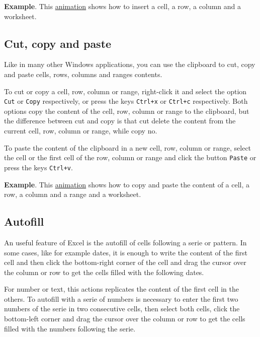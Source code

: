 \textbf{Example}.  This \href{http://aprendeconalf.es/office/excel/manual/img/example_data_insert.gif}{animation} shows how to insert a cell, a row, a column and a worksheet.

\subsection{Cut, copy and paste}\hypertarget{cut-copy-and-paste}{}\label{cut-copy-and-paste}

Like in many other Windows applications, you can use the clipboard to cut, copy and paste cells, rows, columns and ranges contents.

To cut or copy a cell, row, column or range, right-click it and select the option \texttt{Cut} or \texttt{Copy} respectively, or press the keys \texttt{Ctrl+x} or \texttt{Ctrl+c} respectively. Both options copy the content of the cell, row, column or range to the clipboard, but the difference between cut and copy is that cut delete the content from the current cell, row, column or range, while copy no.

To paste the content of the clipboard in a new cell, row, column or range, select the cell or the first cell of the row, column or range and click the button \texttt{Paste} or press the keys \texttt{Ctrl+v}.

\textbf{Example}.  This \href{http://aprendeconalf.es/office/excel/manual/img/example_copy_paste.gif}{animation} shows how to copy and paste the content of a cell, a row, a column and a range and a worksheet.

\subsection{Autofill}\hypertarget{autofill}{}\label{autofill}

An useful feature of Excel is the autofill of cells following a serie or pattern. In some cases, like for example dates, it is enough to write the content of the first cell and then click the bottom-right corner of the cell and drag the cursor over the column or row to get the cells filled with the following dates.

For number or text, this actions replicates the content of the first cell in the others. To autofill with a serie of numbers is necessary to enter the first two numbers of the serie in two consecutive cells, then select both cells, click the bottom-left corner and drag the cursor over the column or row to get the cells filled with the numbers following the serie.

